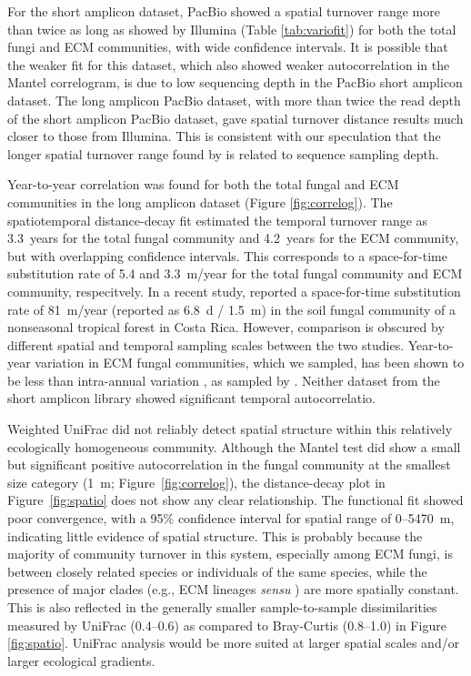 \documentclass[
  12pt,
]{article}
\begin{document}
For the short amplicon dataset, PacBio showed a spatial turnover range more than twice as long as showed by Illumina (Table \ref{tab:variofit}) for both the total fungi and ECM communities, with wide confidence intervals.
It is possible that the weaker fit for this dataset, which also showed weaker autocorrelation in the Mantel correlogram, is due to low sequencing depth in the PacBio short amplicon dataset.
The long amplicon PacBio dataset, with more than twice the read depth of the short amplicon PacBio dataset, gave spatial turnover distance results much closer to those from Illumina.
This is consistent with our speculation that the longer spatial turnover range found by \textcite{Bahram2013} is related to sequence sampling depth.

Year-to-year correlation was found for both the total fungal and ECM communities in the long amplicon dataset (Figure \ref{fig:correlog}).
The spatiotemporal distance-decay fit estimated the temporal turnover range as 3.3~years for the total fungal community and 4.2~years for the ECM community, but with overlapping confidence intervals.
This corresponds to a space-for-time substitution rate of 5.4 and 3.3~m/year for the total fungal community and ECM community, respecitvely.
In a recent study, \textcite{kivlin2020} reported a space-for-time substitution rate of 81~m/year (reported as 6.8~d / 1.5~m) in the soil fungal community of a nonseasonal tropical forest in Costa Rica.
However, comparison is obscured by different spatial and temporal sampling scales between the two studies.
Year-to-year variation in ECM fungal communities, which we sampled, has been shown to be less than intra-annual variation \autocite{bahram2015}, as sampled by \textcite{kivlin2020}.
Neither dataset from the short amplicon library showed significant temporal autocorrelatio.

Weighted UniFrac did not reliably detect spatial structure within this relatively ecologically homogeneous community.
Although the Mantel test did show a small but significant positive autocorrelation in the fungal community at the smallest size category (1~m; Figure~\ref{fig:correlog}), the distance-decay plot in Figure~\ref{fig:spatio} does not show any clear relationship.
The functional fit showed poor convergence, with a 95\% confidence interval for spatial range of 0--5470~m, indicating little evidence of spatial structure.
This is probably because the majority of community turnover in this system, especially among ECM fungi, is between closely related species or individuals of the same species, while the presence of major clades (e.g., ECM lineages \emph{sensu} \textcite{Tedersoo2010}) are more spatially constant.
This is also reflected in the generally smaller sample-to-sample dissimilarities measured by UniFrac (0.4--0.6) as compared to Bray-Curtis (0.8--1.0) in Figure \ref{fig:spatio}.
UniFrac analysis would be more suited at larger spatial scales and/or larger ecological gradients.
\end{document}
